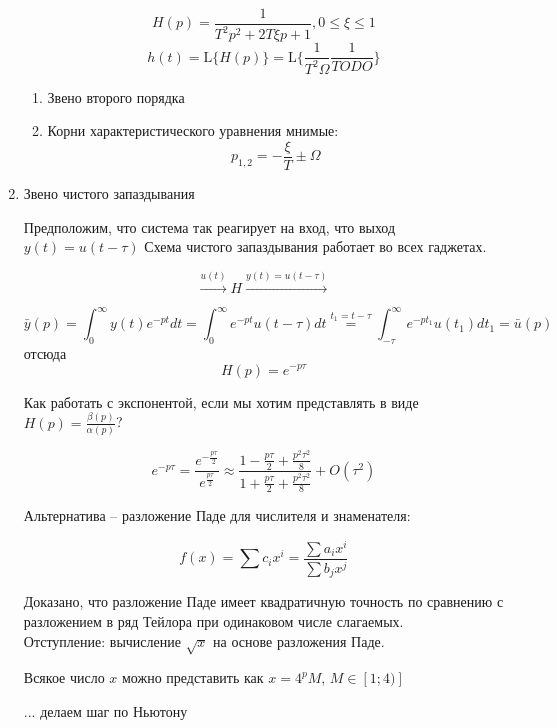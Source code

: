 \documentclass[main.tex]{subfiles}
\begin{document}
\begin{enumerate}[noitemsep]
    $$ H(p) = \frac{1}{T^2p^2 + 2 T \xi p + 1}, 0 \le \xi \le 1 $$
    $$ h(t) = \mathrm{L}\{H(p)\} = \mathrm{L}\{\frac{1}{T^2 \Omega} \frac{1}{TODO}\} $$ %

    \begin{enumerate}[noitemsep]
        \item Звено второго порядка
        \item Корни характеристического уравнения мнимые:
        $$ p_{1,2} = - \frac{\xi}{T} \pm \Omega $$
    \end{enumerate}

    \item Звено чистого запаздывания

    Предположим, что система так реагирует на вход, что выход $ y(t) = u(t-\tau) $
    Схема чистого запаздывания работает во всех гаджетах.

    $$ \xrightarrow{u(t)} \boxed{H} \xrightarrow{y(t)=u(t-\tau)} $$

    $$ \bar y(p) = \int_{0}^{\infty} y(t)e^{-pt}dt = \int_{0}^{\infty} e^{-pt}u(t-\tau) dt \overset{t_1=t-\tau}= \int_{-\tau}^{\infty}e^{-pt_1}u(t_1)dt_1 = \bar u(p)  $$
    отсюда
    $$ \boxed{H(p)=e^{-p\tau}} $$

    Как работать с экспонентой, если мы хотим представлять в виде $ H(p) = \frac{\beta(p)}{\alpha(p)} $?

    $$ e^{-p\tau} = \frac{e^{-\frac{p\tau}{2}}}{e^{\frac{p\tau}{2}}} \approx \frac{1 - \frac{p\tau}{2} + \frac{p^2\tau^2}{8}}{1 + \frac{p\tau}{2} + \frac{p^2\tau^2}{8}} + O(\tau^2) $$ %

    Альтернатива -- разложение Паде для числителя и знаменателя:

    $$ f(x) = \sum c_ix^i = \frac{\sum a_i x^i}{\sum b_j x^j} $$

    Доказано, что разложение Паде имеет квадратичную точность по сравнению с разложением в ряд Тейлора при одинаковом числе слагаемых.\\

    Отступление: вычисление $ \sqrt x $ на основе разложения Паде.

    Всякое число $ x $ можно представить как $ x = 4^pM $, $M \in [1;4)]$

    ... делаем шаг по Ньютону





\end{enumerate}
\end{document}
